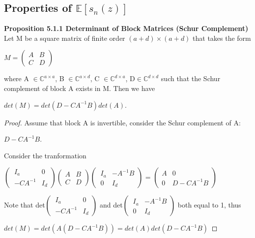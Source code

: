 \documentclass{article}
\begin{document}
\subsection{Properties of $\mathbb{E}[s_n(z)]$}
\textbf{Proposition 5.1.1 Determinant of Block Matrices (Schur Complement)} Let M be a square matrix of finite order $(a+d) \times (a + d)$ that takes the form
\begin{center}
    $M = \left( 
    \begin{array}{cc}
        A &B  \\
        C &D 
    \end{array}
    \right)$
\end{center}
where A $\in \mathbb{C}^{a\times a}$, B $\in \mathbb{C}^{a\times d}$, C $\in \mathbb{C}^{d\times a}$, D$\in \mathbb{C}^{d \times d}$ such that the Schur complement of block A exists in M. Then we have 
\begin{center}
    $det(M) = det(D -CA^{-1}B)det(A)$.
\end{center}
\begin{proof}
    Assume that block A is invertible, consider the Schur complement of A:
    \begin{center}
        $D -CA^{-1}B$.
    \end{center}
    Consider the tranformation \\
    \begin{center}
        $\left( \
        \begin{array}{cc}
        I_a &0\\
        -CA^{-1} &I_d
        \end{array}
        \right)$$\left( 
    \begin{array}{cc}
        A &B  \\
        C &D 
    \end{array}
    \right)$$\left( \
        \begin{array}{cc}
        I_a &-A^{-1}B\\
            0 &I_d
        \end{array}
        \right)$ = $\left( 
    \begin{array}{cc}
        A &0  \\
        0 &D - CA^{-1}B 
    \end{array}
    \right)$
    \end{center}
    
    Note that det$\left( \
        \begin{array}{cc}
        I_a &0\\
        -CA^{-1} &I_d
        \end{array}
        \right)$ and det$\left( \
        \begin{array}{cc}
        I_a &-A^{-1}B\\
        0 &I_d
        \end{array}
        \right)$ both equal to 1, thus
        \\
        \centerline{$det(M) = det(A(D-CA^{-1}B)) = det(A)det(D - CA^{-1}B)$}
\end{proof}
\end{document}
